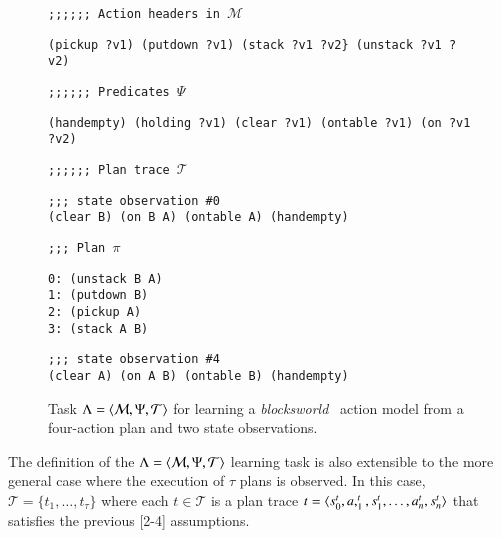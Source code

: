 \begin{figure}[hbt!]
{\footnotesize\tt ;;;;;; Action headers in $\mathcal{M}$}  
\begin{footnotesize}  
\begin{verbatim}
(pickup ?v1) (putdown ?v1) (stack ?v1 ?v2} (unstack ?v1 ?v2)
\end{verbatim}
\end{footnotesize}
\vspace{0.2cm}
{\footnotesize\tt ;;;;;; Predicates $\Psi$}
\begin{footnotesize}
\begin{verbatim}
(handempty) (holding ?v1) (clear ?v1) (ontable ?v1) (on ?v1 ?v2)
\end{verbatim}
\end{footnotesize}
\vspace{0.2cm}
{\footnotesize\tt ;;;;;; Plan trace $\mathcal{T}$}
\begin{footnotesize}
\begin{verbatim}
;;; state observation #0
(clear B) (on B A) (ontable A) (handempty)
\end{verbatim}
\end{footnotesize}

\begin{footnotesize}
{\footnotesize\tt ;;; Plan $\pi$}
\begin{verbatim}
0: (unstack B A)
1: (putdown B)
2: (pickup A)
3: (stack A B)
\end{verbatim}
\end{footnotesize}

\begin{footnotesize}
\begin{verbatim}
;;; state observation #4
(clear A) (on A B) (ontable B) (handempty)
\end{verbatim}
\end{footnotesize}

 \caption{\small Task $\Lambda={\langle \mathcal{M},\Psi,\mathcal{T} \rangle}$ for learning a {\em blocksworld} \strips\ action model from a four-action plan and two state observations.}
\label{fig:example-plans}
\end{figure}

The definition of the $\Lambda={\langle \mathcal{M},\Psi,\mathcal{T} \rangle}$ learning task is also extensible to the more general case where the execution of $\tau$ plans is observed. In this case, $\mathcal{T}=\{t_1,\ldots,t_{\tau}\}$ where each $t\in \mathcal{T}$ is a plan trace $t={\langle s_0^t,a,_1^t,s_1^t,\ldots,a_n^t,s_{n}^t \rangle}$ that satisfies the previous [2-4] assumptions.



